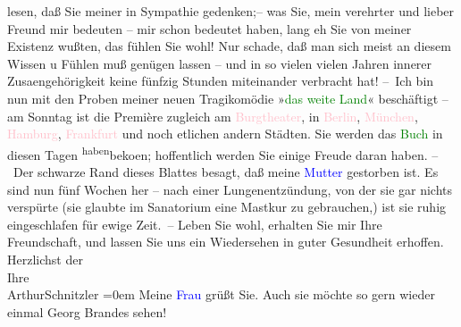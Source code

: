                     lesen, daß Sie meiner {\pb}in Sympathie
                    gedenken;– was Sie, mein verehrter und lieber Freund mir bedeuten – mir schon
                    bedeutet haben, lang eh Sie von meiner Existenz wußten, das fühlen Sie wohl! Nur
                    schade, daß man sich meist an diesem Wissen u Fühlen muß genügen lassen – und in
                    so vielen vielen Jahren innerer Zusa{\geminationm}engehörigkeit
                    keine fünfzig Stunden miteinander verbracht hat!\pend
           \pstart
           – Ich bin nun mit den Proben meiner {\pb}neuen
                    Tragikomödie »\textcolor{green}{das weite Land}{}\ledrightnote{\textcolor{green}{Das weite Land. Tragikomödie in fünf Akten}}« beschäftigt – am
                    Sonntag ist die Première zugleich am \textcolor{pink}{Burgtheater}{}\ledrightnote{\textcolor{pink}{Burgtheater}}, in \textcolor{pink}{Berlin}{}\ledrightnote{\textcolor{pink}{Berlin}}, \textcolor{pink}{München}{}\ledrightnote{\textcolor{pink}{München}}, \textcolor{pink}{Hamburg}{}\ledrightnote{\textcolor{pink}{Hamburg}}, \textcolor{pink}{Frankfurt}{}\ledrightnote{\textcolor{pink}{Frankfurt am Main}} und noch etlichen andern Städten. Sie
                    werden das \textcolor{green}{Buch}{} in diesen
                    Tagen \substVorne{}\textsuperscript{haben}\substDazwischen{}beko{\geminationm}en\substHinten{}; hoffentlich werden Sie einige Freude daran haben.\pend
           \pstart
           – Der schwarze Rand dieses Blattes besagt, daß meine \textcolor{blue}{Mutter}{} gestorben ist. Es sind nun fünf
                    Wochen her – nach einer {\pb}Lungenentzündung,
                    von der sie gar nichts verspürte (sie glaubte im Sanatorium eine Mastkur zu
                    gebrauchen,) ist sie ruhig eingeschlafen für ewige Zeit. –\pend
           \pstart
           Leben Sie wohl, erhalten Sie mir Ihre Freundschaft, und lassen Sie uns ein
                    Wiedersehen in guter Gesundheit erhoffen.\pend
           \pstart
           Herzlichst der{\\[\baselineskip]}Ihre{\\[\baselineskip]}\spacefill\mbox{ArthurSchnitzler}\pend
           \leftskip=0em{}\pstart
           \noindent{}Meine \textcolor{blue}{Frau}{} grüßt Sie.
                        Auch sie möchte so gern wieder einmal Georg Brandes sehen!\pend
           \endnumbering{}  
      